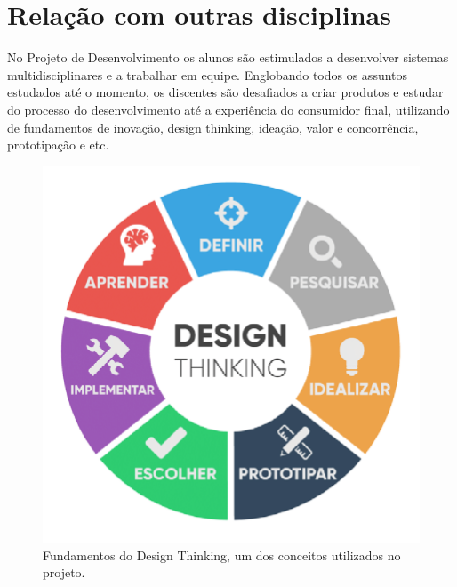 \documentclass{article}
\begin{document}
\section{Relação com outras disciplinas}
    No Projeto de Desenvolvimento os alunos são estimulados a desenvolver sistemas multidisciplinares e a trabalhar em equipe. Englobando todos os assuntos estudados até o momento, os discentes são desafiados a criar produtos e estudar do processo do desenvolvimento até a experiência do consumidor final, utilizando de fundamentos de inovação, design thinking, ideação, valor e concorrência, prototipação e etc. \cite{Site3}

\begin{figure}[h!]
\centering
\includegraphics[scale=0.3]{designthinking}
\caption{Fundamentos do Design Thinking, um dos conceitos utilizados no projeto. \cite{Site4}}
\label{fig:designthinking}
\end{figure}




\end{document}
